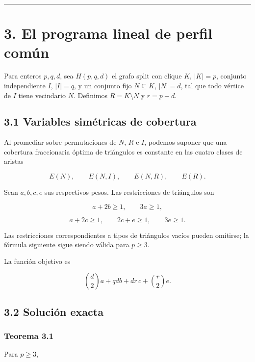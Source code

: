 \documentclass[
  11pt,
]{article}
\begin{document}
\begin{center}\rule{0.5\linewidth}{0.5pt}\end{center}

\section{3. El programa lineal de perfil
común}\label{el-programa-lineal-de-perfil-comuxfan}

Para enteros \(p,q,d\), sea \(H(p,q,d)\) el grafo split con clique
\(K\), \(|K|=p\), conjunto independiente \(I\), \(|I|=q\), y un conjunto
fijo \(N\subseteq K\), \(|N|=d\), tal que todo vértice de \(I\) tiene
vecindario \(N\). Definimos \(R=K\setminus N\) y \(r=p-d\).

\subsection{3.1 Variables simétricas de
cobertura}\label{variables-simuxe9tricas-de-cobertura}

Al promediar sobre permutaciones de \(N\), \(R\) e \(I\), podemos
suponer que una cobertura fraccionaria óptima de triángulos es constante
en las cuatro clases de aristas

\[
E(N),
\qquad E(N,I),
\qquad E(N,R),
\qquad E(R).
\]

Sean \(a,b,c,e\) sus respectivos pesos. Las restricciones de triángulos
son

\[
a+2b\ge1,
\qquad
3a\ge1,
\tag{3.1}
\]

\[
a+2c\ge1,
\qquad
2c+e\ge1,
\qquad
3e\ge1.
\tag{3.2}
\]

Las restricciones correspondientes a tipos de triángulos vacíos pueden
omitirse; la fórmula siguiente sigue siendo válida para \(p\ge3\).

La función objetivo es

\[
\binom d2a+qdb+dr\,c+\binom r2e.
\tag{3.3}
\]

\subsection{3.2 Solución exacta}\label{soluciuxf3n-exacta}

\subsubsection{Teorema 3.1}\label{teorema-3.1-fuxf3rmula-de-perfil-comuxfan}

Para \(p\ge3\),
\end{document}

